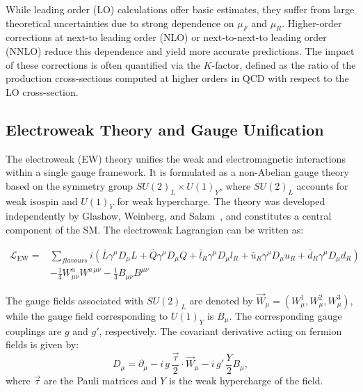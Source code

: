While leading order (LO) calculations offer basic estimates, they suffer from large theoretical uncertainties due to strong dependence on $\mu_F$ and $\mu_R$. Higher-order corrections at next-to leading order (NLO) or next-to-next-to leading order (NNLO) reduce this dependence and yield more accurate predictions. The impact of these corrections is often quantified via the $K$-factor, defined as the ratio of the production cross-sections computed at higher orders in QCD with respect to the LO cross-section.

\subsection{Electroweak Theory and Gauge Unification}
\label{subsec:ew_theory}

The electroweak (EW) theory unifies the weak and electromagnetic interactions within a single gauge framework. It is formulated as a non-Abelian gauge theory based on the symmetry group $SU(2)_L \times U(1)_Y$, where $SU(2)_L$ accounts for weak isospin and $U(1)_Y$ for weak hypercharge. The theory was developed independently by Glashow, Weinberg, and Salam~\cite{Glashow,Weinberg,Salam}, and constitutes a central component of the SM. The electroweak Lagrangian can be written as:

\begin{equation}
\begin{split}
\mathcal{L}_{\text{EW}} = 
&\sum_{flavours} i(\bar{L}\gamma^\mu D_\mu L +\bar{Q}\gamma^\mu D_\mu Q + \bar{l}_{R}\gamma^\mu D_\mu l_{R} + \bar{u}_{R}\gamma^\mu D_\mu u_{R} + \bar{d}_{R}\gamma^\mu D_\mu d_{R}) \\
&- \frac{1}{4} W_{\mu\nu}^a W^{a\,\mu\nu} - \frac{1}{4} B_{\mu\nu} B^{\mu\nu}
\end{split}
\label{eq:ew_lagrangian}
\end{equation}

The gauge fields associated with $SU(2)_L$ are denoted by $\vec{W}_\mu = (W_\mu^1, W_\mu^2, W_\mu^3)$, while the gauge field corresponding to $U(1)_Y$ is $B_\mu$. The corresponding gauge couplings are $g$ and $g'$, respectively. The covariant derivative acting on fermion fields is given by:
\begin{equation}
D_\mu = \partial_\mu - i \, g \, \frac{\vec{\tau}}{2} \cdot \vec{W}_\mu - i \, g' \, \frac{Y}{2} B_\mu,
\end{equation}
where $\vec{\tau}$ are the Pauli matrices and $Y$ is the weak hypercharge of the field.

